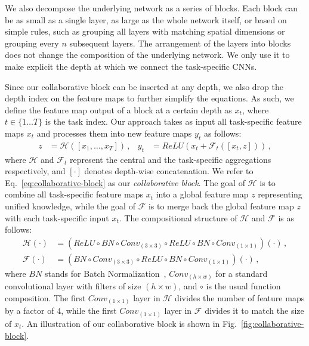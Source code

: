 \documentclass[runningheads]{llncs}
\newcommand{\citep}{\cite}
\begin{document}
We also decompose the underlying network as a series of blocks. Each block can be as small as a single layer, as large as the whole network itself, or based on simple rules, such as grouping all layers with matching spatial dimensions or grouping every $n$ subsequent layers. The arrangement of the layers into blocks does not change the composition of the underlying network. We only use it to make explicit the depth at which we connect the task-specific CNNs.

Since our collaborative block can be inserted at any depth, we also drop the depth index on the feature maps to further simplify the equations. As such, we define the feature map output of a block at a certain depth as $x_t$, where $ t \in \{1 \ldots T\}$ is the task index. Our approach takes as input all task-specific feature maps $x_t$ and processes them into new feature maps $y_t$ as follows:
\begin{align}
\label{eq:collaborative-block}
z &= \mathcal{H}([x_1, \ldots, x_T]) \,, & y_t &= ReLU\left( x_t + \mathcal{F}_t([x_t, z]) \right) \, ,
\end{align}
where $\mathcal{H}$ and $\mathcal{F}_t$ represent the central and the task-specific aggregations respectively, and $[\cdot]$ denotes depth-wise concatenation. We refer to Eq.~\eqref{eq:collaborative-block} as our \textit{collaborative block}. The goal of $\mathcal{H}$ is to combine all task-specific feature maps $x_t$ into a global feature map $z$ representing unified knowledge, while the goal of $\mathcal{F}$ is to merge back the global feature map $z$ with each task-specific input $x_t$. The compositional structure of $\mathcal{H}$ and $\mathcal{F}$ is as follows:
\begin{align}
\mathcal{H}(\cdot) &= (ReLU \circ BN \circ Conv_{(3 \times 3)} \circ ReLU \circ BN \circ Conv_{(1 \times 1)})(\cdot) \, , \\
\mathcal{F}(\cdot) &= (BN \circ Conv_{(3 \times 3)} \circ ReLU  \circ BN \circ Conv_{(1 \times 1)})(\cdot) \, ,
\end{align}
where $BN$ stands for Batch Normalization~\citep{ioffe2015batch}, $Conv_{(h \times w)}$ for a standard convolutional layer with filters of size $(h \times w)$, and $\circ$ is the usual function composition. The first $Conv_{(1 \times 1)}$ layer in $\mathcal{H}$ divides the number of feature maps by a factor of $4$, while the first $Conv_{(1 \times 1)}$ layer in $\mathcal{F}$ divides it to match the size of $x_t$. An illustration of our collaborative block is shown in Fig.~\ref{fig:collaborative-block}.
\end{document}

